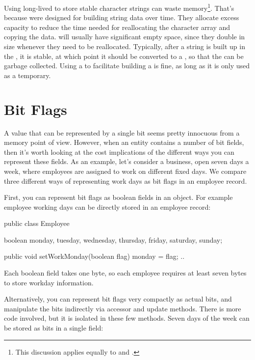 Using long-lived  to store stable character strings 
can waste memory\footnote{This discussion
applies equally to  and .}. That's
because  were designed for building string data over time. They
allocate excess capacity to reduce the time needed for reallocating the
character array and copying the data.   will usually
have significant empty space, since they double in size whenever they need to be reallocated. 
Typically, after a string is built up in the , it is stable, at which point
it should be converted to a , so that the  can be
garbage collected. Using a  to facilitate
building a  is fine, as long as it is only used as a
temporary.

\section{Bit Flags}
\label{sec:bit-flags}

A value that can be represented by a single bit seems pretty innocuous from a
memory point of view. However, when an entity contains a number of bit
fields, then it's worth looking at the cost implications of
the different ways you can represent these fields. As an example, let's
consider a business, open seven days a week, where employees are 
assigned to work on different fixed days.  We compare three different ways of representing
work days as bit flags in an employee record.
 
First, you can represent bit flags as boolean fields in an object. For example
employee working days can be directly stored in an employee record:
\begin{shortlisting}

    public class Employee {
    	boolean monday, tuesday, wednesday, thursday, friday, saturday, sunday;
    	
    	public void setWorkMonday(boolean flag) {
    		monday = flag;
    	}
    	..
    }
    
\end{shortlisting}

Each boolean field takes one byte, so each employee requires at least seven
bytes to store workday information. 

Alternatively, you can represent bit flags very compactly as actual bits, and
manipulate the bits indirectly via accessor and update methods. There is more
code involved, but it is isolated in these few methods. Seven days of the week can be stored as
bits in a single  field:


